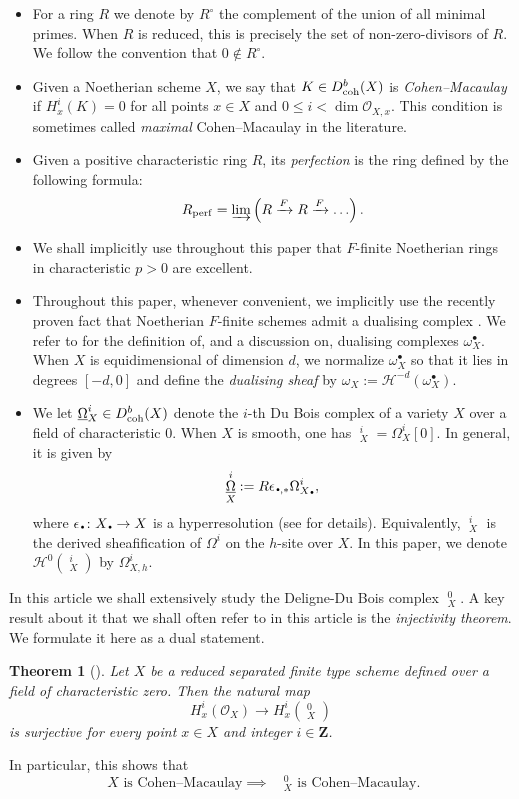 \documentclass[letterpaper,11pt]{amsart}
\DeclareMathOperator{\DDB}{\underline{\Omega}}
\newcommand{\kdot}{{{\,\begin{picture}(1,1)(-1,-2)\circle*{2}\end{picture}\,}}}
\theoremstyle{plain}
\newtheorem{thm}{Theorem}[section]
\theoremstyle{definition}
\theoremstyle{remark}
\def\Z{{\mathbf Z}}
\def\cH{\mathcal{H}}
\def\cO{\mathcal{O}}
\begin{document}
\begin{itemize}
\item For a ring $R$ we denote by $R^\circ$ the complement of the union of all minimal primes. When $R$ is reduced, this is precisely the set of
non-zero-divisors of $R$. We follow the convention that $0 \not \in R^\circ$. 
\item Given a Noetherian scheme $X$, we say that $K \in D^b_{\rm coh}(X)$ is \emph{Cohen--Macaulay} if $H^i_x(K) = 0$ for all points $x \in X$ and $0 \leq i < \dim \cO_{X,x}$. This condition is sometimes called \emph{maximal} Cohen--Macaulay in the literature.
\item Given a positive characteristic ring $R$, its \emph{perfection} is the ring defined by the following formula:
\[
R_{\rm perf} = \varinjlim \left(R \xrightarrow{F} R \xrightarrow{F}  \ldots \right). 
\]
\item We shall implicitly use throughout this paper that $F$-finite Noetherian rings in characteristic $p>0$ are excellent.
\item Throughout this paper, whenever convenient, we implicitly use the recently proven fact that Noetherian $F$-finite schemes admit a dualising complex \cite{bhatt2026ffiniteschemesdualizingcomplex}. We refer to \cite[Tag 0A85]{stacks-project} for the definition of, and a discussion on, dualising complexes $\omega^\bullet_X$. When $X$ is equidimensional of dimension $d$, we normalize $\omega^\bullet_X$ so that it lies in degrees $[-d,0]$ and define the \emph{dualising sheaf} by $\omega_X := \cH^{-d}(\omega^\bullet_X)$.
\item We let $\DDB^i_X \in D^b_{\rm coh}(X)$ denote the $i$-th Du Bois complex of a variety $X$ over a field of characteristic $0$. When $X$ is smooth, one has $\DDB^i_X=\Omega^i_X[0]$. In general, it is given by
\[
\DDB^i_X := R\epsilon_{\kdot,*}\Omega^i_{X_\kdot},
\]
where $\epsilon_\kdot \colon X_{\kdot}\to X$ is a hyperresolution (see \cite[Chapter~7.3]{PetersSteenbrink} for details). Equivalently, $\DDB^i_X$ is the derived  sheafification of $\Omega^i$ on the $h$-site over $X$. In this paper, we denote $\cH^0(\DDB^i_X)$ by $\Omega^i_{X,h}$. 
\end{itemize}

In this article we shall extensively study the Deligne-Du Bois complex $\DDB^0_X$. A key result about it that we shall often refer to in this article is the \emph{injectivity theorem}. We formulate it here as a dual statement. 
\begin{thm}[{\cite[Theorem 3.3]{KS}}] \label{thm:injectivity}
Let $X$ be a reduced  separated finite type scheme defined over a field of characteristic zero. Then the natural map
\[
H^i_x(\cO_X) \to H^i_x(\DDB^0_X)
\]
is surjective for every point $x \in X$ and integer $i \in \Z$.
\end{thm}
In particular, this shows that
\begin{equation} \label{eq:DDBCM}
\text{ $X$ is Cohen--Macaulay} \implies \text{ $\DDB^0_X$ is Cohen--Macaulay.}
\end{equation}
\end{document}
